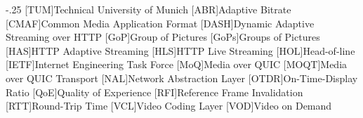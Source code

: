 \documentclass[headsepline,footsepline,footinclude=false,oneside,fontsize=11pt,paper=a4,listof=totoc,bibliography=totoc]{scrbook} %
\begin{document}
% 

\frontmatter{}

% 
% 
% 
% 
\tableofcontents{}

\mainmatter{}






% 
% 

\appendix{}


\begin{acronym}
	\itemsep-.25\baselineskip
	[TUM]{Technical University of Munich}
    [ABR]{Adaptive Bitrate}
	[CMAF]{Common Media Application Format}
	[DASH]{Dynamic Adaptive Streaming over HTTP}
	[GoP]{Group of Pictures}
	[GoPs]{Groups of Pictures}
	[HAS]{HTTP Adaptive Streaming}
	[HLS]{HTTP Live Streaming}
	[HOL]{Head-of-line}
	[IETF]{Internet Engineering Task Force}
	[MoQ]{Media over QUIC}
	[MOQT]{Media over QUIC Transport}
	[NAL]{Network Abstraction Layer}
	[OTDR]{On-Time-Display Ratio}
	[QoE]{Quality of Experience}
	[RFI]{Reference Frame Invalidation}
	[RTT]{Round-Trip Time}
	[VCL]{Video Coding Layer}
	[VOD]{Video on Demand}
\end{acronym}

\listoffigures{}
\listoftables{}
\printbibliography{}
\end{document}
